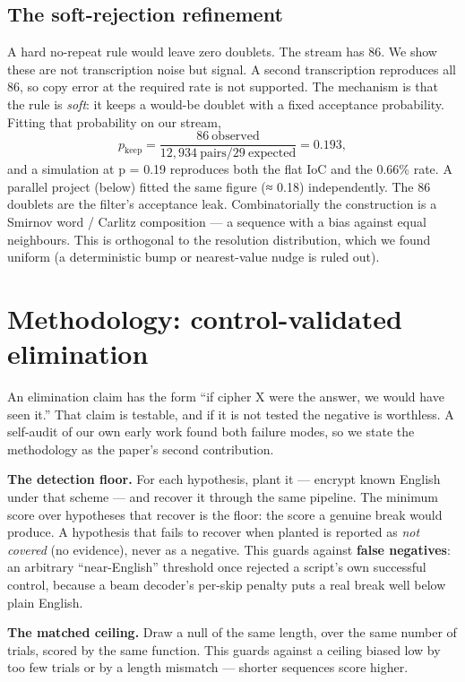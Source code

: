\documentclass[11pt]{article}
\begin{document}
\subsection{The soft-rejection refinement}

A hard no-repeat rule would leave zero doublets. The stream has 86. We show these are not transcription noise but signal. A second transcription reproduces all 86, so copy error at the required rate is not supported. The mechanism is that the rule is \emph{soft}: it keeps a would-be doublet with a fixed acceptance probability. Fitting that probability on our stream,
\[ p_{\text{keep}} = \frac{86\ \text{observed}}{12{,}934\ \text{pairs} / 29\ \text{expected}} = 0.193, \]
and a simulation at p = 0.19 reproduces both the flat IoC and the 0.66\% rate. A parallel project (below) fitted the same figure (≈ 0.18) independently. The 86 doublets are the filter's acceptance leak. Combinatorially the construction is a Smirnov word / Carlitz composition --- a sequence with a bias against equal neighbours. This is orthogonal to the resolution distribution, which we found uniform (a deterministic bump or nearest-value nudge is ruled out).

\section{Methodology: control-validated elimination}

An elimination claim has the form ``if cipher X were the answer, we would have seen it.'' That claim is testable, and if it is not tested the negative is worthless. A self-audit of our own early work found both failure modes, so we state the methodology as the paper's second contribution.

\textbf{The detection floor.} For each hypothesis, plant it --- encrypt known English under that scheme --- and recover it through the same pipeline. The minimum score over hypotheses that recover is the floor: the score a genuine break would produce. A hypothesis that fails to recover when planted is reported as \emph{not covered} (no evidence), never as a negative. This guards against \textbf{false negatives}: an arbitrary ``near-English'' threshold once rejected a script's own successful control, because a beam decoder's per-skip penalty puts a real break well below plain English.

\textbf{The matched ceiling.} Draw a null of the same length, over the same number of trials, scored by the same function. This guards against a ceiling biased low by too few trials or by a length mismatch --- shorter sequences score higher.
\end{document}
